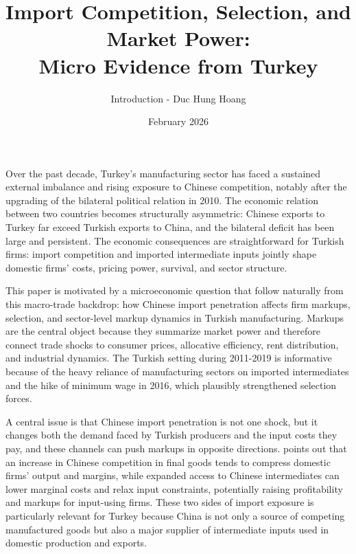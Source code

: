 \documentclass[12pt]{article}
\title{Import Competition, Selection, and Market Power: \\ Micro Evidence from Turkey}
\author{Introduction - Duc Hung Hoang}
\date{February 2026}
\begin{document}
\maketitle

Over the past decade, Turkey's manufacturing sector has faced a sustained external imbalance and rising exposure to Chinese competition, notably after the upgrading of the bilateral political relation in 2010. The economic relation between two countries becomes structurally asymmetric: Chinese exports to Turkey far exceed Turkish exports to China, and the bilateral deficit has been large and persistent. The economic consequences are straightforward for Turkish firms: import competition and imported intermediate inputs jointly shape domestic firms' costs, pricing power, survival, and sector structure. 

This paper is motivated by a microeconomic question that follow naturally from this macro-trade backdrop: how Chinese import penetration affects firm markups, selection, and sector-level markup dynamics in Turkish manufacturing. Markups are the central object because they summarize market power and therefore connect trade shocks to consumer prices, allocative efficiency, rent distribution, and industrial dynamics. The Turkish setting during 2011-2019 is informative because of the heavy reliance of manufacturing sectors on imported intermediates and the hike of minimum wage in 2016, which plausibly strengthened selection forces.

A central issue is that Chinese import penetration is not one shock, but it changes both the demand faced by Turkish producers and the input costs they pay, and these channels can push markups in opposite directions. \textcite{aghionOpposingFirmLevelResponses2024} points out that an increase in Chinese competition in final goods tends to compress domestic firms' output and margins, while expanded access to Chinese intermediates can lower marginal costs and relax input constraints, potentially raising profitability and markups for input-using firms. These two sides of import exposure is particularly relevant for Turkey because China is not only a source of competing manufactured goods but also a major supplier of intermediate inputs used in domestic production and exports.
\end{document}
